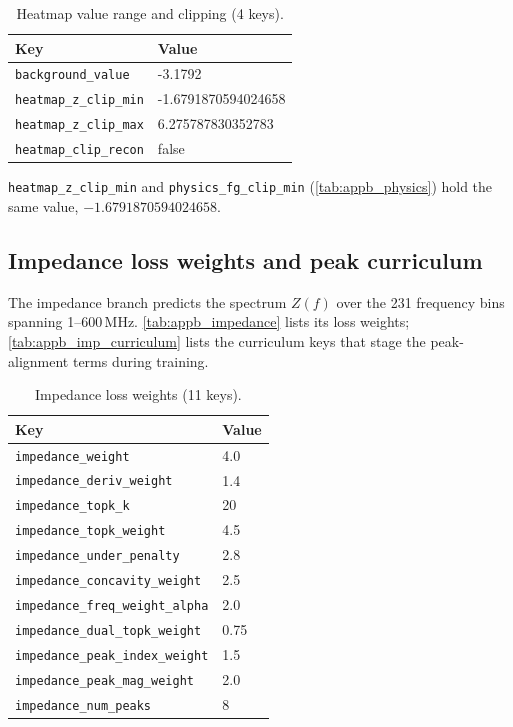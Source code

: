 \begin{table}[htbp]
\centering
\caption{Heatmap value range and clipping (4 keys).}
\label{tab:appb_heatmap_clip}
\begin{tabular}{@{}ll@{}}
\hline
Key & Value \\
\hline
\texttt{background\_value} & -3.1792 \\
\texttt{heatmap\_z\_clip\_min} & -1.6791870594024658 \\
\texttt{heatmap\_z\_clip\_max} & 6.275787830352783 \\
\texttt{heatmap\_clip\_recon} & false \\
\hline
\end{tabular}
\end{table}

\texttt{heatmap\_z\_clip\_min} and \texttt{physics\_fg\_clip\_min}
(\autoref{tab:appb_physics}) hold the same value, $-1.6791870594024658$.

\clearpage

\subsection{Impedance loss weights and peak curriculum}
\label{subsec:appb_impedance_loss}

The impedance branch predicts the spectrum $Z(f)$ over the 231 frequency bins spanning
1--600\,MHz. \autoref{tab:appb_impedance} lists its loss weights;
\autoref{tab:appb_imp_curriculum} lists the curriculum keys that stage the peak-alignment
terms during training.

\begin{table}[htbp]
\centering
\caption{Impedance loss weights (11 keys).}
\label{tab:appb_impedance}
\begin{tabular}{@{}ll@{}}
\hline
Key & Value \\
\hline
\texttt{impedance\_weight} & 4.0 \\
\texttt{impedance\_deriv\_weight} & 1.4 \\
\texttt{impedance\_topk\_k} & 20 \\
\texttt{impedance\_topk\_weight} & 4.5 \\
\texttt{impedance\_under\_penalty} & 2.8 \\
\texttt{impedance\_concavity\_weight} & 2.5 \\
\texttt{impedance\_freq\_weight\_alpha} & 2.0 \\
\texttt{impedance\_dual\_topk\_weight} & 0.75 \\
\texttt{impedance\_peak\_index\_weight} & 1.5 \\
\texttt{impedance\_peak\_mag\_weight} & 2.0 \\
\texttt{impedance\_num\_peaks} & 8 \\
\hline
\end{tabular}
\end{table}


